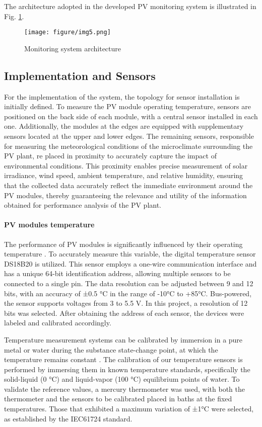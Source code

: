 The architecture adopted in the developed PV monitoring system is illustrated in Fig. \ref{fig:exemplo}.

\begin{figure}[b]
\centering
\texttt{[image: figure/img5.png]}
\caption{Monitoring system architecture}
\label{fig:exemplo}
\end{figure}

\subsection{Implementation and Sensors}

For the implementation of the system, the topology for sensor installation is initially defined. To measure the PV module operating temperature, sensors are positioned on the back side of each module, with a central sensor installed in each one. Additionally, the modules at the edges are equipped with supplementary sensors located at the upper and lower edges. The remaining sensors, responsible for measuring the meteorological conditions of the microclimate surrounding the PV plant, re placed in proximity to accurately capture the impact of environmental conditions. This proximity enables precise measurement of solar irradiance, wind speed, ambient temperature, and relative humidity, ensuring that the collected data accurately reflect the immediate environment around the PV modules, thereby guaranteeing the relevance and utility of the information obtained for performance analysis of the PV plant. 

\paragraph{PV modules temperature}
The performance of PV modules is significantly influenced by their operating temperature \cite{santos2024hybrid}. To accurately measure this variable, the digital temperature sensor DS18B20 is utilized. This sensor employs a one-wire communication interface and has a unique 64-bit identification address, allowing multiple sensors to be connected to a single pin. The data resolution can be adjusted between 9 and 12 bits, with an accuracy of ±0.5 °C in the range of -10°C to +85°C. Bus-powered, the sensor supports voltages from 3 to 5.5 V. In this project, a resolution of 12 bits was selected. After obtaining the address of each sensor, the devices were labeled and calibrated accordingly.

Temperature measurement systems can be calibrated by immersion in a pure metal or water during the substance state-change point, at which the temperature remains constant \cite{bolton2003mechatronics}. The calibration of our temperature sensors is performed by immersing them in known temperature standards, specifically the solid-liquid (0 °C) and liquid-vapor (100 °C) equilibrium points of water. To validate the reference values, a mercury thermometer was used, with both the thermometer and the sensors to be calibrated placed in baths at the fixed temperatures. Those that exhibited a maximum variation of ±1°C were selected, as established by the IEC61724 standard.

